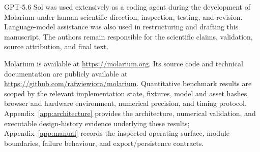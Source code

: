 \documentclass[11pt]{article}
\begin{document}
GPT-5.6 Sol was used extensively as a coding agent during the development of Molarium under human scientific direction, inspection, testing, and revision. Language-model assistance was also used in restructuring and drafting this manuscript. The authors remain responsible for the scientific claims, validation, source attribution, and final text.

Molarium is available at \url{https://molarium.org}. Its source code and technical documentation are publicly available at \url{https://github.com/rafwiewiora/molarium}. Quantitative benchmark results are scoped by the relevant implementation state, fixtures, model and asset hashes, browser and hardware environment, numerical precision, and timing protocol. Appendix~\ref{app:architecture} provides the architecture, numerical validation, and executable design-history evidence underlying these results; Appendix~\ref{app:manual} records the inspected operating surface, module boundaries, failure behaviour, and export/persistence contracts.

\appendix
\end{document}
